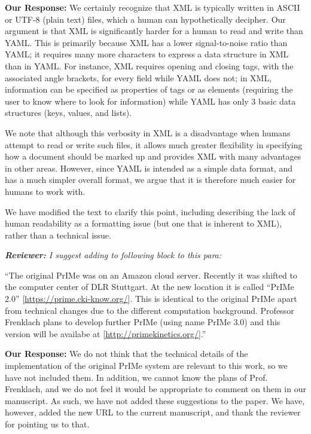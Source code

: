 \documentclass[a4paper,10pt]{elsarticle}
\newenvironment{reviewer}{\vspace{0.5\baselineskip}\begingroup\itshape\textbf{Reviewer:}}{\endgroup\vspace{0.5\baselineskip}}
\newenvironment{response}{\vspace{0.5\baselineskip}\textbf{Our Response:}}{\vspace{0.5\baselineskip}}
\begin{document}
\begin{response}
    We certainly recognize that XML is typically written in ASCII or UTF-8 (plain text) files, which
    a human can hypothetically decipher. Our argument is that XML is significantly harder for a
    human to read and write than YAML. This is primarily because XML has a lower signal-to-noise
    ratio than YAML; it requires many more characters to express a data structure in XML than in
    YAML. For instance, XML requires opening and closing tags, with the associated angle brackets,
    for every field while YAML does not; in XML, information can be specified as properties of tags
    or as elements (requiring the user to know where to look for information) while YAML has only 3 basic data structures (keys, values, and lists).

    We note that although this verbosity in XML is a disadvantage when humans attempt to read or
    write such files, it allows much greater flexibility in specifying how a document should be
    marked up and provides XML with many advantages in other areas. However, since YAML is intended
    as a simple data format, and has a much simpler overall format, we argue that it is therefore
    much easier for humans to work with.

    We have modified the text to clarify this point, including describing the lack of human
    readability as a formatting issue (but one that is inherent to XML), rather than a technical
    issue.
\end{response}

\begin{reviewer}
    I suggest adding to following block to this para:

    ``The original PrIMe was on an Amazon cloud server. Recently it was shifted to the computer
    center of DLR Stuttgart. At the new location it is called ``PrIMe 2.0''
    [\url{https://prime.cki-know.org/}]. This is identical to the original PrIMe apart from
    technical changes due to the different computation background. Professor Frenklach plans to
    develop further PrIMe (using name PrIMe 3.0) and this version will be availabe at
    [\url{http://primekinetics.org/}].''
\end{reviewer}

\begin{response}
    We do not think that the technical details of the implementation of the original PrIMe system
    are relevant to this work, so we have not included them. In addition, we cannot know
    the plans of Prof. Frenklach, and we do not feel it would be appropriate to comment on them in
    our manuscript. As such, we have not added these suggestions to the paper. We have, however,
    added the new URL to the current manuscript, and thank the reviewer for pointing us to that.
\end{response}
\end{document}
